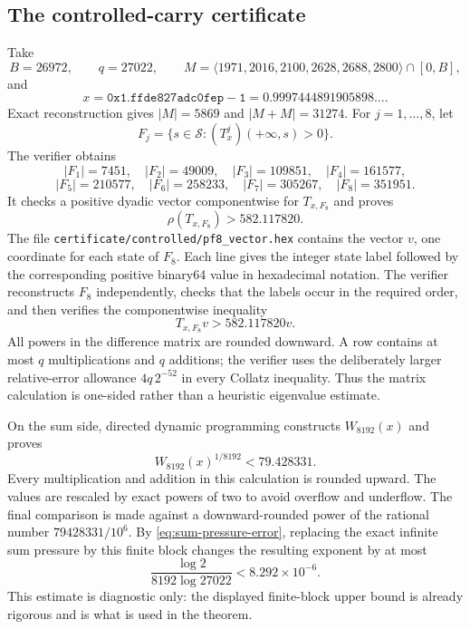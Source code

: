 \documentclass[11pt]{article}
\newcommand{\card}[1]{\lvert #1\rvert}
\newcommand{\angles}[1]{\langle #1\rangle}
\begin{document}
\subsection{The controlled-carry certificate}\label{sec:controlled-certificate}
Take
\begin{equation}\label{eq:controlled-mask}
 B=26972,\qquad q=27022,
\qquad
 M=\angles{1971,2016,2100,2628,2688,2800}\cap[0,B],
\end{equation}
and
\begin{equation}\label{eq:controlled-x}
 x=\mathtt{0x1.ffde827adc0fep-1}
 =0.9997444891905898\ldots.
\end{equation}
Exact reconstruction gives $\card M=5869$ and $\card{M+M}=31274$.
For $j=1,\ldots,8$, let
\[
 F_j=\{s\in\mathcal S:(T_x^j)(+\infty,s)>0\}.
\]
The verifier obtains
\[
 \card{F_1}=7451,\quad \card{F_2}=49009,\quad
 \card{F_3}=109851,\quad \card{F_4}=161577,
\]
\[
 \card{F_5}=210577,\quad \card{F_6}=258233,\quad
 \card{F_7}=305267,\quad \card{F_8}=351951.
\]
It checks a positive dyadic vector componentwise for $T_{x,F_8}$ and proves
\[
 \rho(T_{x,F_8})>582.117820.
\]
The file \texttt{certificate/controlled/pf8\_vector.hex} contains the vector
$v$, one coordinate for each state of $F_8$.  Each line gives the integer
state label followed by the corresponding positive binary64 value in
hexadecimal notation.  The verifier reconstructs $F_8$ independently,
checks that the labels occur in the required order, and then verifies the
componentwise inequality
\[
 T_{x,F_8}v>582.117820v.
\]
All powers in the difference matrix are rounded downward.  A row contains at
most $q$ multiplications and $q$ additions; the verifier uses the deliberately
larger relative-error allowance $4q\,2^{-52}$ in every Collatz inequality.
Thus the matrix calculation is one-sided rather than a heuristic eigenvalue
estimate.

On the sum side, directed dynamic programming constructs $W_{8192}(x)$ and
proves
\[
 W_{8192}(x)^{1/8192}<79.428331.
\]
Every multiplication and addition in this calculation is rounded upward.
The values are rescaled by exact powers of two to avoid overflow and
underflow.  The final comparison is made against a downward-rounded power of
the rational number $79428331/10^6$.  By
\eqref{eq:sum-pressure-error}, replacing the exact infinite sum pressure by
this finite block changes the resulting exponent by at most
\[
 \frac{\log2}{8192\log27022}<8.292\times10^{-6}.
\]
This estimate is diagnostic only: the displayed finite-block upper bound is
already rigorous and is what is used in the theorem.
\end{document}
